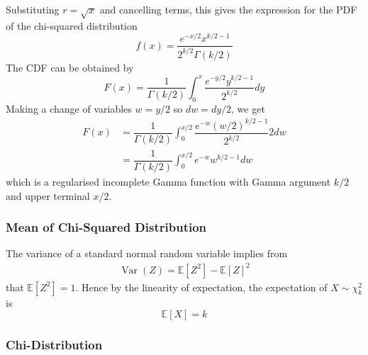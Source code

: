 \documentclass[11pt]{report} %
\begin{document}
Substituting $r = \sqrt{x}$ and cancelling terms, this gives the expression for the PDF of the chi-squared distribution
\begin{equation}
f\left(x\right) = \dfrac{e^{-x/2}x^{k/2 - 1}}{2^{k/2}\Gamma\left(k/2\right)}
\end{equation}
The CDF can be obtained by
\begin{equation}
F\left(x\right) = \dfrac{1}{\Gamma\left(k/2\right)}\int_{0}^{x}\dfrac{e^{-y/2}y^{k/2-1}}{2^{k/2}}dy
\end{equation}
Making a change of variables $w = y/2$ so $dw = dy/2$, we get
\begin{align}
F\left(x\right) &= \dfrac{1}{\Gamma\left(k/2\right)}\int_{0}^{x/2}\dfrac{e^{-w}\left(w/2\right)^{k/2-1}}{2^{k/2}}2dw \\
&= \dfrac{1}{\Gamma\left(k/2\right)}\int_{0}^{x/2}e^{-w}w^{k/2-1}dw
\end{align}
which is a regularised incomplete Gamma function with Gamma argument $k/2$ and upper terminal $x/2$.

\subsubsection{Mean of Chi-Squared Distribution}

The variance of a standard normal random variable implies from
\begin{gather}
\operatorname{Var}\left(Z\right) = \mathbb{E}\left[Z^{2}\right] - \mathbb{E}\left[Z\right]^{2}
\end{gather}
that $\mathbb{E}\left[Z^{2}\right] = 1$. Hence by the linearity of expectation, the expectation of $X \sim \chi_{k}^{2}$ is
\begin{equation}
\mathbb{E}\left[X\right] = k
\end{equation}

\subsubsection{Chi-Distribution}
\end{document}

